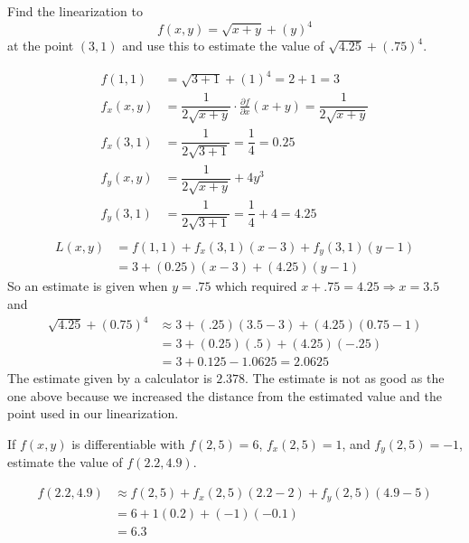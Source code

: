 \documentclass[12pt]{exam}
\begin{document}
\begin{questions}
\question Find the linearization to 
    \[
        f(x,y)=\sqrt{x+y}+(y)^4
    \] at the point \((3,1)\) and use this to estimate the value of
        \(\sqrt{4.25}+(.75)^4\).
\ifprintanswers
        \begin{solution}
            \begin{align*}
                f(1,1) & = \sqrt{3+1}+(1)^4 = 2+1=3\\
                f_{x}(x,y) & = \dfrac{1}{2\sqrt{x+y}}\cdot\frac{\partial f}{\partial x}(x+y) = \dfrac{1}{2\sqrt{x+y}}\\
                f_{x}(3,1) & = \dfrac{1}{2\sqrt{3+1}} = \dfrac{1}{4} = 0.25\\
                f_{y}(x,y) & = \dfrac{1}{2\sqrt{x+y}}+4y^3\\
                f_{y}(3,1) & = \dfrac{1}{2\sqrt{3+1}} = \dfrac{1}{4}+4 =4.25\\
            \end{align*}
            \begin{align*}
                L(x,y) & = f(1,1)+f_{x}(3,1)(x-3)+f_{y}(3,1)(y-1)\\
                    & = 3+(0.25)(x-3)+(4.25)(y-1)
            \end{align*}
            So an estimate is given when \(y=.75\) which required \(x+.75=4.25\Rightarrow x=3.5\) and 
            \begin{align*}
                \sqrt{4.25}+(0.75)^4 & \approx 3+(.25)(3.5-3)+(4.25)(0.75-1)\\
                    & = 3+(0.25)(.5)+(4.25)(-.25)\\
                    & = 3+0.125-1.0625 = 2.0625
            \end{align*}
            The estimate given by a calculator is \(2.378\). The estimate is not as good as the one above because we increased the distance from the estimated value and the point used in our linearization.

        \end{solution}
    \else
        \vfill
    \fi

\question If \(f(x,y)\) is differentiable with \(f(2,5)=6\), \(f_x(2,5)=1\), and \(f_y(2,5)=-1\), estimate the value of \(f(2.2,4.9)\).
\ifprintanswers
        \begin{solution}
            \begin{align*}
                f(2.2,4.9) & \approx f(2,5)+f_{x}(2,5)(2.2-2)+f_{y}(2,5)(4.9-5)\\
                    & = 6+1(0.2)+(-1)(-0.1)\\
                    & = 6.3
            \end{align*}
        \end{solution}
    \else
        \vfill
    \fi

\question 
    
\end{questions}
\end{document}

